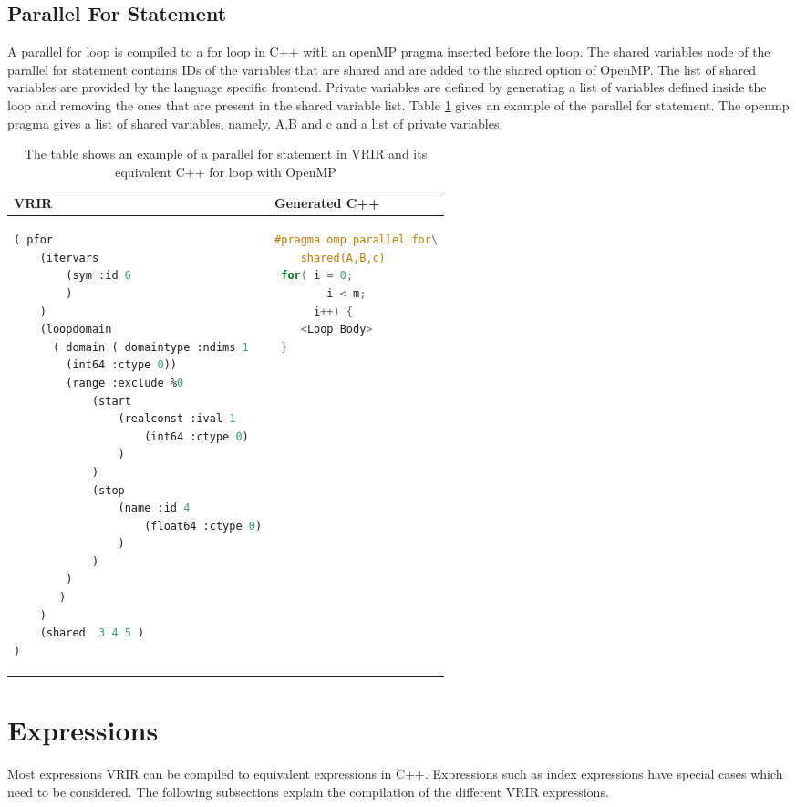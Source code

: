 \subsection{Parallel For Statement}
A parallel for loop is compiled to a for loop  in C++ with an openMP pragma inserted before the loop. The shared variables node of the parallel for statement contains IDs of the variables that are shared and are added to the shared option of OpenMP. The list of shared variables are provided by the language specific frontend. Private variables are defined by generating a list of variables defined inside the loop and removing the ones that are present in the shared variable list. Table \ref{tab:pForStmt} gives an example of the parallel for statement. The openmp pragma gives a list of shared variables, namely, A,B and c and a list of private variables.
\begin{table}[htbp]
\centering
\begin{tabular}{|l|l|}
\hline

VRIR &  Generated C++ \\
\hline
{
\begin{lstlisting}[language=lisp,frame=none, numbers=none]
( pfor
	(itervars 
		(sym :id 6 
		)
	)
	(loopdomain 
	  ( domain ( domaintype :ndims 1 
		(int64 :ctype 0))
		(range :exclude %0 
   			(start  
   				(realconst :ival 1
					(int64 :ctype 0)
				)
			)
			(stop  
   				(name :id 4 
					(float64 :ctype 0)
				)
			)
		)
	   )
	)
	(shared  3 4 5 )
)
\end{lstlisting}
}
&
{
\begin{lstlisting}[language=c,frame=none, numbers=none]
#pragma omp parallel for\
	shared(A,B,c)
 for( i = 0; 
	    i < m;
      i++) {
	<Loop Body>
 }

\end{lstlisting}
} \\
\hline
\end{tabular}
\caption[Parallel For example]{The table shows an example of a parallel for statement in VRIR and its equivalent C++ for loop with OpenMP}
\label{tab:pForStmt}
\end{table}

\section{Expressions}
Most expressions VRIR can be compiled to equivalent expressions in C++. Expressions such as index expressions have special cases which need to be considered. The following subsections explain the compilation of the different VRIR expressions.
